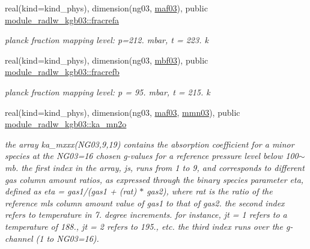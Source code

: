 \begin{DoxyCompactItemize}
real(kind=kind\+\_\+phys), dimension(ng03, \hyperlink{group__module__radlw__kgbnn_ga90d1081db011f0682cb4a83c40c5bb23}{maf03}), public \hyperlink{group__module__radlw__kgbnn_ga26e901a002e789933c5c9b622f3a0932}{module\+\_\+radlw\+\_\+kgb03\+::fracrefa}
\begin{DoxyCompactList}\small\item\em planck fraction mapping level\+: p=212. mbar, t = 223. k \end{DoxyCompactList}\item 
\mbox{\label{group__module__radlw__kgbnn_gaf1d33a7362e73bf40ef592bc9863b612}} 
real(kind=kind\+\_\+phys), dimension(ng03, \hyperlink{group__module__radlw__kgbnn_ga655fff8711d78d62ae9d4fa27d02621a}{mbf03}), public \hyperlink{group__module__radlw__kgbnn_gaf1d33a7362e73bf40ef592bc9863b612}{module\+\_\+radlw\+\_\+kgb03\+::fracrefb}
\begin{DoxyCompactList}\small\item\em planck fraction mapping level\+: p = 95. mbar, t = 215. k \end{DoxyCompactList}\item 
\mbox{\label{group__module__radlw__kgbnn_gaeeba4e0a8fc97c557e1127b4d5d1bd94}} 
real(kind=kind\+\_\+phys), dimension(ng03, \hyperlink{group__module__radlw__kgbnn_ga90d1081db011f0682cb4a83c40c5bb23}{maf03}, \hyperlink{group__module__radlw__kgbnn_gab4e84b10460930267256c0e5a1fe7a55}{mmn03}), public \hyperlink{group__module__radlw__kgbnn_gaeeba4e0a8fc97c557e1127b4d5d1bd94}{module\+\_\+radlw\+\_\+kgb03\+::ka\+\_\+mn2o}
\begin{DoxyCompactList}\small\item\em the array ka\+\_\+mxxx(\+N\+G03,9,19) contains the absorption coefficient for a minor species at the N\+G03=16 chosen g-\/values for a reference pressure level below 100$\sim$ mb. the first index in the array, js, runs from 1 to 9, and corresponds to different gas column amount ratios, as expressed through the binary species parameter eta, defined as eta = gas1/(gas1 + (rat) $\ast$ gas2), where rat is the ratio of the reference mls column amount value of gas1 to that of gas2. the second index refers to temperature in 7. degree increments. for instance, jt = 1 refers to a temperature of 188., jt = 2 refers to 195., etc. the third index runs over the g-\/channel (1 to N\+G03=16). \end{DoxyCompactList}\item 

\end{DoxyCompactItemize}
